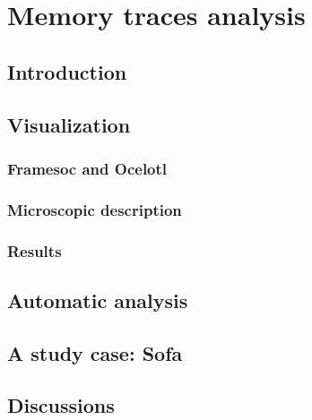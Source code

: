 \chapter{Memory traces analysis}


\section{Introduction}


\section{Visualization}

\subsection{Framesoc and Ocelotl}

\subsection{Microscopic description}

\subsection{Results}

\section{Automatic analysis}


\section{A study case: Sofa}



\section{Discussions}

